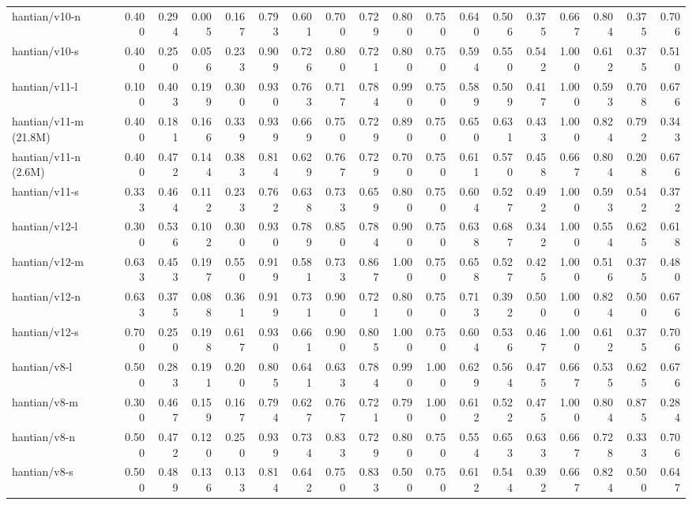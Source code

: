 \documentclass[border=2pt]{standalone}
\begin{document}
\begin{tabular}{lrrrrrrrrrrrrrrrrr}
hantian/v10-n & 0.400 & 0.294 & 0.005 & 0.167 & 0.793 & 0.601 & 0.700 & 0.729 & 0.800 & 0.750 & 0.640 & 0.506 & 0.375 & 0.667 & 0.804 & 0.375 & 0.706 \\
hantian/v10-s & 0.400 & 0.250 & 0.056 & 0.233 & 0.909 & 0.726 & 0.800 & 0.721 & 0.800 & 0.750 & 0.594 & 0.550 & 0.542 & 1.000 & 0.612 & 0.375 & 0.510 \\
hantian/v11-l & 0.100 & 0.403 & 0.199 & 0.300 & 0.930 & 0.763 & 0.717 & 0.784 & 0.990 & 0.750 & 0.589 & 0.509 & 0.417 & 1.000 & 0.593 & 0.708 & 0.676 \\
hantian/v11-m (21.8M) & 0.400 & 0.181 & 0.166 & 0.339 & 0.939 & 0.669 & 0.750 & 0.729 & 0.890 & 0.750 & 0.650 & 0.631 & 0.433 & 1.000 & 0.824 & 0.792 & 0.343 \\
hantian/v11-n (2.6M) & 0.400 & 0.472 & 0.144 & 0.383 & 0.814 & 0.629 & 0.767 & 0.729 & 0.700 & 0.750 & 0.611 & 0.570 & 0.458 & 0.667 & 0.804 & 0.208 & 0.676 \\
hantian/v11-s & 0.333 & 0.464 & 0.112 & 0.233 & 0.762 & 0.638 & 0.733 & 0.659 & 0.800 & 0.750 & 0.604 & 0.527 & 0.492 & 1.000 & 0.593 & 0.542 & 0.372 \\
hantian/v12-l & 0.300 & 0.536 & 0.102 & 0.300 & 0.930 & 0.789 & 0.850 & 0.784 & 0.900 & 0.750 & 0.638 & 0.687 & 0.342 & 1.000 & 0.554 & 0.625 & 0.618 \\
hantian/v12-m & 0.633 & 0.453 & 0.197 & 0.550 & 0.919 & 0.581 & 0.733 & 0.867 & 1.000 & 0.750 & 0.658 & 0.527 & 0.425 & 1.000 & 0.516 & 0.375 & 0.480 \\
hantian/v12-n & 0.633 & 0.375 & 0.088 & 0.361 & 0.919 & 0.731 & 0.900 & 0.721 & 0.800 & 0.750 & 0.713 & 0.392 & 0.500 & 1.000 & 0.824 & 0.500 & 0.676 \\
hantian/v12-s & 0.700 & 0.250 & 0.198 & 0.617 & 0.930 & 0.661 & 0.900 & 0.805 & 1.000 & 0.750 & 0.604 & 0.536 & 0.467 & 1.000 & 0.612 & 0.375 & 0.706 \\
hantian/v8-l & 0.500 & 0.283 & 0.191 & 0.200 & 0.805 & 0.641 & 0.633 & 0.784 & 0.990 & 1.000 & 0.629 & 0.564 & 0.475 & 0.667 & 0.535 & 0.625 & 0.676 \\
hantian/v8-m & 0.300 & 0.467 & 0.159 & 0.167 & 0.794 & 0.627 & 0.767 & 0.721 & 0.790 & 1.000 & 0.612 & 0.522 & 0.475 & 1.000 & 0.804 & 0.875 & 0.284 \\
hantian/v8-n & 0.500 & 0.472 & 0.120 & 0.250 & 0.939 & 0.734 & 0.833 & 0.729 & 0.800 & 0.750 & 0.554 & 0.653 & 0.633 & 0.667 & 0.728 & 0.333 & 0.706 \\
hantian/v8-s & 0.500 & 0.489 & 0.136 & 0.133 & 0.814 & 0.642 & 0.750 & 0.833 & 0.500 & 0.750 & 0.612 & 0.544 & 0.392 & 0.667 & 0.824 & 0.500 & 0.647 \\

\end{tabular}
\end{document}
